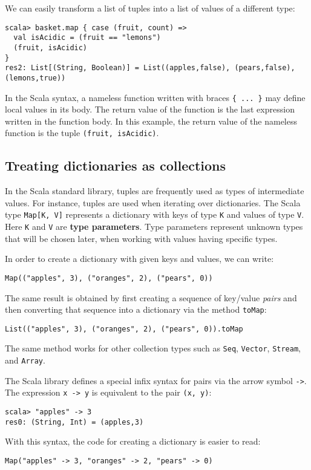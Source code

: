 We can easily transform a list of tuples into a list of values of
a different type:
\begin{lstlisting}
scala> basket.map { case (fruit, count) =>
  val isAcidic = (fruit == "lemons")
  (fruit, isAcidic)
}
res2: List[(String, Boolean)] = List((apples,false), (pears,false), (lemons,true)) 
\end{lstlisting}
In the Scala syntax, a nameless function written with braces \lstinline!{ ... }!
may define local values in its body. The return value of the function
is the last expression written in the function body. In this example,
the return value of the nameless function is the tuple \lstinline!(fruit, isAcidic)!.

\subsection{Treating dictionaries as collections}

In the Scala standard library, tuples are frequently used as types
of intermediate values. For instance, tuples are used when iterating
over dictionaries. The Scala type \lstinline!Map[K, V]! represents
a dictionary with keys of type \lstinline!K! and values of type \lstinline!V!.
Here \lstinline!K! and \lstinline!V! are \textbf{type parameters}.
Type parameters represent unknown types that will be chosen later,
when working with values having specific types.

In order to create a dictionary with given keys and values, we can
write:
\begin{lstlisting}
Map(("apples", 3), ("oranges", 2), ("pears", 0))
\end{lstlisting}
The same result is obtained by first creating a sequence of key/value
\emph{pairs} and then converting that sequence into a dictionary via
the method \lstinline!toMap!:
\begin{lstlisting}
List(("apples", 3), ("oranges", 2), ("pears", 0)).toMap
\end{lstlisting}
The same method works for other collection types such as \lstinline!Seq!,
\lstinline!Vector!, \lstinline!Stream!, and \lstinline!Array!. 

The Scala library defines a special infix syntax for pairs via the
arrow symbol \lstinline!->!. The expression \lstinline!x -> y! is
equivalent to the pair \lstinline!(x, y)!:
\begin{lstlisting}
scala> "apples" -> 3
res0: (String, Int) = (apples,3)
\end{lstlisting}
With this syntax, the code for creating a dictionary is easier to
read:
\begin{lstlisting}
Map("apples" -> 3, "oranges" -> 2, "pears" -> 0)
\end{lstlisting}

